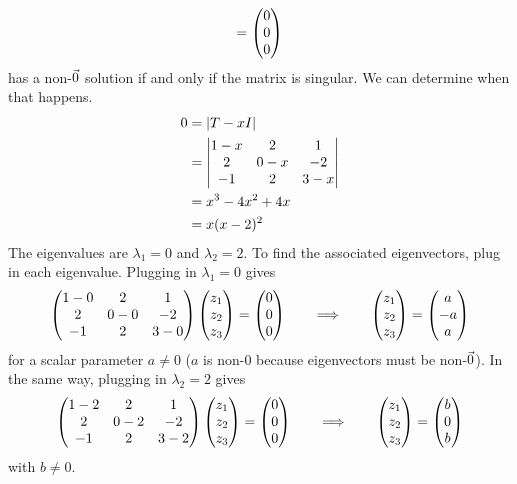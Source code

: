 \begin{example}
\begin{equation*}
  =
  \begin{pmatrix} 0 \\ 0 \\ 0 \end{pmatrix}
\end{equation*}
has a non-\( \vec{0} \) solution if and only if the
matrix is singular.
We can determine when that happens.
\begin{align*}
  0
  &=\deter{T-x I}                                               \\
  &=\begin{vmatrix}
     1-x          &2            &1            \\
     2           &0-x          &-2           \\
    -1           &2            &3-x
   \end{vmatrix}                                       \\
  &=x^3-4x^2+4x  \\
  &=x(x-2)^2
\end{align*}
The eigenvalues are \( \lambda_1=0 \) and \( \lambda_2=2 \).
To find the associated eigenvectors, plug in each eigenvalue.
Plugging in $\lambda_1=0$ gives
\begin{equation*}
  \begin{pmatrix}
     1-0         &2            &1            \\
     2           &0-0          &-2           \\
    -1           &2            &3-0
  \end{pmatrix}
  \begin{pmatrix} z_1 \\ z_2 \\ z_3 \end{pmatrix}
  =
  \begin{pmatrix} 0 \\ 0 \\ 0 \end{pmatrix}
  \qquad\Longrightarrow\qquad
  \begin{pmatrix} z_1 \\ z_2 \\ z_3 \end{pmatrix}
  =
  \begin{pmatrix} a \\ -a \\ a \end{pmatrix}
\end{equation*}
for a scalar parameter \( a\neq 0 \)
(\( a \) is non-\( 0 \) because eigenvectors must be non-\( \vec{0} \)).
In the same way, plugging in $\lambda_2=2$ gives 
\begin{equation*}
  \begin{pmatrix}
     1-2         &2            &1            \\
     2           &0-2          &-2           \\
    -1           &2            &3-2
  \end{pmatrix}
  \begin{pmatrix} z_1 \\ z_2 \\ z_3 \end{pmatrix}
  =
  \begin{pmatrix} 0 \\ 0 \\ 0 \end{pmatrix}
  \qquad\Longrightarrow\qquad
  \begin{pmatrix} z_1 \\ z_2 \\ z_3 \end{pmatrix}
  =
  \begin{pmatrix} b \\ 0 \\ b \end{pmatrix}
\end{equation*}
with \( b\neq 0 \).
\end{example}

